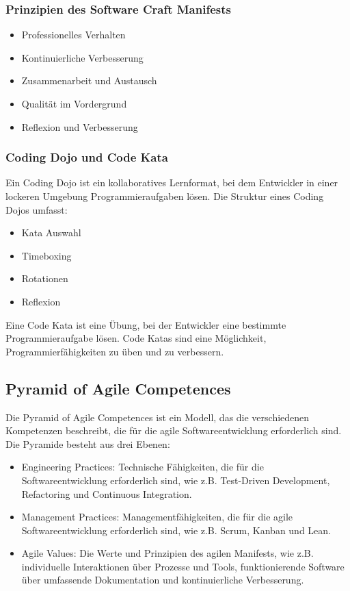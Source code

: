 \subsubsection{Prinzipien des Software Craft Manifests}
\begin{itemize}
    \item Professionelles Verhalten
    \item Kontinuierliche Verbesserung
    \item Zusammenarbeit und Austausch
    \item Qualität im Vordergrund
    \item Reflexion und Verbesserung
\end{itemize}

\subsubsection{Coding Dojo und Code Kata}
Ein Coding Dojo ist ein kollaboratives Lernformat, bei dem Entwickler in einer lockeren Umgebung Programmieraufgaben lösen. Die Struktur eines Coding Dojos umfasst:
\begin{itemize}
    \item Kata Auswahl
    \item Timeboxing
    \item Rotationen
    \item Reflexion
\end{itemize}

Eine Code Kata ist eine Übung, bei der Entwickler eine bestimmte Programmieraufgabe lösen. Code Katas sind eine Möglichkeit, Programmierfähigkeiten zu üben und zu verbessern.

\subsection{Pyramid of Agile Competences}

Die Pyramid of Agile Competences ist ein Modell, das die verschiedenen Kompetenzen beschreibt, die für die agile Softwareentwicklung erforderlich sind. Die Pyramide besteht aus drei Ebenen:
\begin{itemize}
    \item Engineering Practices: Technische Fähigkeiten, die für die Softwareentwicklung erforderlich sind, wie z.B. Test-Driven Development, Refactoring und Continuous Integration.
    \item Management Practices: Managementfähigkeiten, die für die agile Softwareentwicklung erforderlich sind, wie z.B. Scrum, Kanban und Lean.
    \item Agile Values: Die Werte und Prinzipien des agilen Manifests, wie z.B. individuelle Interaktionen über Prozesse und Tools, funktionierende Software über umfassende Dokumentation und kontinuierliche Verbesserung.
\end{itemize}


